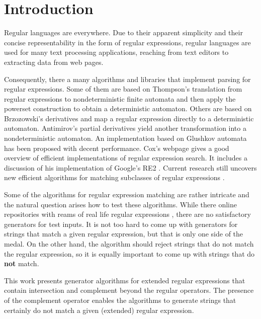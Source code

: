 \section{Introduction}

Regular languages are everywhere. Due to their apparent simplicity and
their concise representability in the form of regular expressions,
regular languages are used for many text processing
applications, reaching from text editors
\cite{DBLP:journals/cacm/Thompson68} to extracting data from web
pages.

Consequently, there a many algorithms and libraries that implement
parsing for regular expressions. Some of them are based on Thompson's
translation from regular expressions to nondeterministic finite
automata and then apply the powerset construction to obtain a
deterministic automaton. Others are based on Brzozowski's derivatives
\cite{Brzozowski1964} and
map a regular expression directly to a deterministic
automaton. Antimirov's partial derivatives \cite{Antimirov96Partial}
yield another transformation into a nondeterministic automaton. An
implementation based on Glushkov automata has been proposed
\cite{DBLP:conf/icfp/FischerHW10} with decent performance.
Cox's webpage \cite{cox07:_implem_regul_expres} gives a good overview
of efficient implementations of regular expression search. It includes
a discussion of his implementation of Google's RE2 \cite{cox10:_regul_expres_match_wild}.
Current research still uncovers new efficient algorithms for matching
subclasses of regular expressions \cite{DBLP:journals/jcss/GrozM17}.

Some of the algorithms for regular expression matching are rather
intricate and the natural question arises how to test these algorithms. 
While there online repositories with reams of real life regular
expressions \cite{regul_expres_librar}, there are no satisfactory
generators for test inputs. It is not too hard to come up with
generators for strings that match a given regular expression, but that
is only one side of the medal. On the other hand, the algorithm should
reject strings that do not match the regular expression, so it is
equally important to come up with strings that do \textbf{not} match.

This work presents generator algorithms for extended regular expressions that
contain intersection and complement beyond the regular operators. The
presence of the complement operator enables the algorithms to generate
strings that certainly do not match a given (extended) regular
expression.

